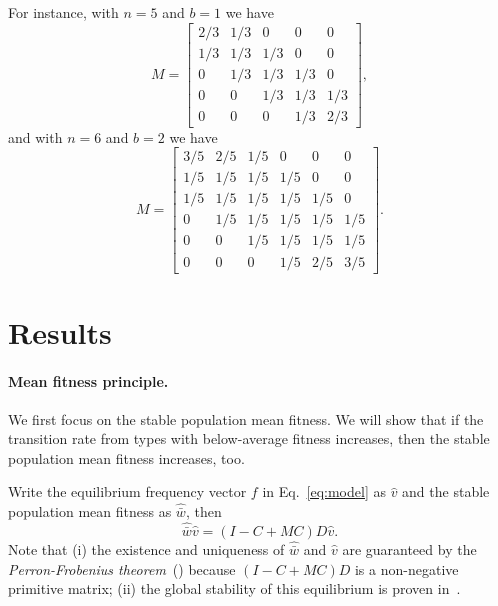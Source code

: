 \documentclass[9pt, a4paper, twocolumn]{extarticle}
\begin{document}
For instance, with $n=5$ and $b=1$ we have
\begin{equation}
M = \begin{bmatrix}
2/3 & 1/3 & 0 & 0 & 0 \\
1/3 & 1/3 & 1/3 & 0 & 0 \\
0 & 1/3 & 1/3 & 1/3 & 0 \\
0 & 0 & 1/3 & 1/3 & 1/3 \\
0 & 0 & 0 & 1/3 & 2/3
\end{bmatrix},
\end{equation}
and with $n=6$ and $b=2$ we have
\begin{equation}
M = \begin{bmatrix}
3/5 & 2/5 & 1/5 & 0 & 0 & 0 \\
1/5 & 1/5 & 1/5 & 1/5 & 0 & 0 \\
1/5 & 1/5 & 1/5 & 1/5 & 1/5 & 0 \\
0 & 1/5 & 1/5 & 1/5 & 1/5 & 1/5 \\
0 & 0 & 1/5 & 1/5 & 1/5 & 1/5 \\
0 & 0 & 0 & 1/5 & 2/5 & 3/5
\end{bmatrix}.
\end{equation}

\section*{Results}

\paragraph*{Mean fitness principle.}

We first focus on the stable population mean fitness.
We will show that if the transition rate from types with below-average fitness increases, then the stable population mean fitness increases, too.

Write the equilibrium  frequency vector $f$ in Eq.~\ref{eq:model} as $\hat v$ and the stable population mean fitness as $\hat{\bar w}$, then
\begin{equation}\label{eq:model_equilibrium}
\hat{\bar w} \hat v = (I-C+MC)D \hat v.
\end{equation}
Note that (i) the existence and uniqueness of $\hat{\bar w}$ and $\hat v$ are guaranteed by the \emph{Perron-Frobenius theorem}~(\cite{Otto2007}) because $(I-C+MC)D$ is a non-negative primitive matrix; 
(ii) the global stability of this equilibrium is proven in~.
\end{document}
